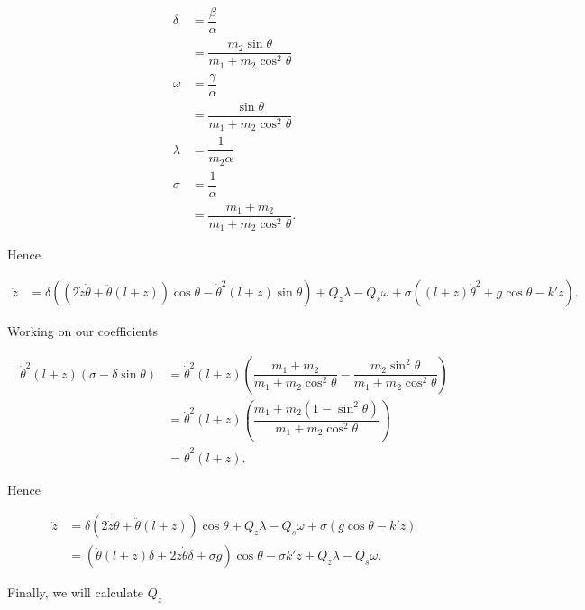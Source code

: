 \documentclass[12pt,a4paper,portrait]{article}
\begin{document}
	\begin{align*}
		\delta &= \dfrac{\beta}{\alpha} \\
		&= \dfrac{m_2\sin{\theta}}{m_1+m_2\cos^2{\theta}}\\
		\omega &= \dfrac{\gamma}{\alpha} \\
		&= \dfrac{\sin{\theta}}{m_1+m_2\cos^2{\theta}}\\
		\lambda &= \dfrac{1}{m_2 \alpha}\\
		\sigma &= \dfrac{1}{\alpha} \\
		&= \dfrac{m_1+m_2}{m_1+m_2\cos^2{\theta}}.
	\end{align*}
	
	Hence
	
	\begin{align*}
		\ddot{z} &= \delta\left((2\dot{z}\dot{\theta} + \ddot{\theta}(l+z))\cos{\theta} - \dot{\theta}^2(l+z)\sin{\theta}\right) + Q_z \lambda - Q_s\omega + \sigma\left((l+z)\dot{\theta}^2 + g\cos{\theta} - k'z\right).
	\end{align*}
	
	Working on our coefficients
	
	\begin{align*}
		\dot{\theta}^2(l+z)(\sigma - \delta \sin{\theta}) &= \dot{\theta}^2(l+z)\left(\dfrac{m_1+m_2}{m_1+m_2\cos^2{\theta}}-\dfrac{m_2\sin^2{\theta}}{m_1+m_2\cos^2{\theta}}\right) \\
		&= \dot{\theta}^2(l+z)\left(\dfrac{m_1+m_2(1-\sin^2{\theta})}{m_1+m_2\cos^2{\theta}}\right) \\
		&= \dot{\theta}^2(l+z).
	\end{align*}
	
	Hence
	
	\begin{align*}
	\ddot{z} &= \delta(2\dot{z}\dot{\theta} + \ddot{\theta}(l+z))\cos{\theta} + Q_z \lambda - Q_s\omega + \sigma\left(g\cos{\theta} - k'z\right)\\
	&= (\ddot{\theta}(l+z)\delta + 2\dot{z}\dot{\theta}\delta + \sigma g)\cos{\theta} - \sigma k'z + Q_z \lambda - Q_s\omega.	
	\end{align*}
	
	Finally, we will calculate $Q_z$
	
\end{document}
